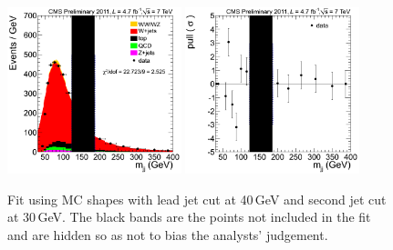 \begin{figure}
\begin{center}
  \includegraphics[width=0.45\textwidth]{figs/ElectronCuts/Params_Wjj_Mjj_Electron_2jets_Stacked.png}
  \includegraphics[width=0.45\textwidth]{figs/ElectronCuts/Params_Wjj_Mjj_Electron_2jets_Pull.png}
\end{center}
\caption{\label{fig:ElectronParam}Fit using MC shapes with lead jet cut at 40\,GeV and second jet cut at 30\,GeV.  The black bands are the points not included in the fit and are hidden so as not to bias the analysts' judgement.}
\end {figure}

